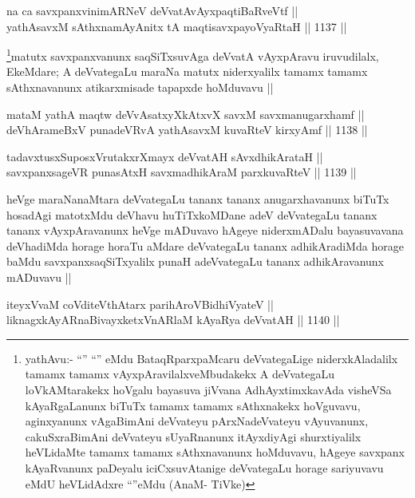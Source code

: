 \begin{shl}
na ca savxpanxvinimARNeV deVvatAvAyxpaqtiBaRveVtf || \\
yathAsavxM sAthxnamAyAnitx tA maqtisavxpayoVyaRtaH ||  1137 || 
\end{shl}

\begin{artha}
\footnote{yathAvu:- ``\stext'' ``\stext'' eMdu BataqRparxpaMcaru deVvategaLige niderxkAladalilx tamamx tamamx vAyxpAravilalxveMbudakekx A deVvategaLu loVkAMtarakekx hoVgalu bayasuva jiVvana AdhAyxtimxkavAda visheVSa kAyaRgaLanunx biTuTx tamamx tamamx sAthxnakekx hoVguvavu, aginxyanunx vAgaBimAni deVvateyu pArxNadeVvateyu vAyuvanunx, cakuSxraBimAni deVvateyu sUyaRnanunx itAyxdiyAgi shurxtiyalilx heVLidaMte tamamx tamamx sAthxnavanunx hoMduvavu, hAgeye savxpanx kAyaRvanunx paDeyalu iciCxsuvAtanige deVvategaLu horage sariyuvavu eMdU heVLidAdxre ``\stext''eMdu (AnaM- TiVke)}matutx savxpanxvanunx saqSiTxsuvAga deVvatA vAyxpAravu iruvudilalx, EkeMdare; A deVvategaLu maraNa matutx niderxyalilx tamamx tamamx sAthxnavanunx atikarxmisade tapapxde hoMduvavu ||
\end{artha}


\begin{shl}
mataM yathA maqtw deVvAsatxyXkAtxvX savxM savxmanugarxhamf || \\
deVhArameBxV punadeVRvA yathAsavxM kuvaRteV kirxyAmf ||  1138 ||  
\end{shl}
				
\begin{shl}
tadavxtusxSuposxVrutakxrXmayx deVvatAH sAvxdhikArataH ||  \\
savxpanxsageVR punasAtxH savxmadhikAraM parxkuvaRteV ||  1139 ||  
\end{shl}

\begin{artha}
heVge maraNanaMtara deVvategaLu tananx tananx anugarxhavanunx biTuTx hosadAgi matotxMdu deVhavu huTiTxkoMDane adeV deVvategaLu tananx tananx vAyxpAravanunx heVge mADuvavo hAgeye niderxmADalu bayasuvavana deVhadiMda horage horaTu aMdare deVvategaLu tananx adhikAradiMda horage baMdu savxpanxsaqSiTxyalilx punaH adeVvategaLu tananx adhikAravanunx mADuvavu ||
\end{artha}

\begin{shl}
iteyxVvaM coVditeV\s thAtarx parihAroV\s BidhiVyateV || \\
liknagxkAyARnaBivayxketxVnARlaM kAyaRya deVvatAH ||  1140 ||  
\end{shl}

